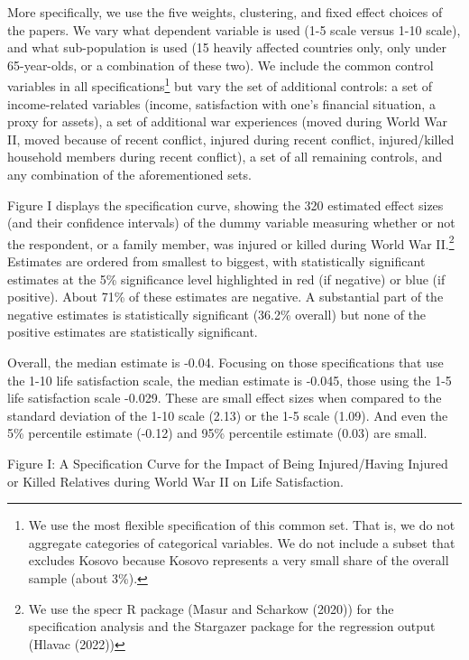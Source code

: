\documentclass[
  letterpaper,
  DIV=11,
  numbers=noendperiod]{scrartcl}
\begin{document}
More specifically, we use the five weights, clustering, and fixed effect
choices of the papers. We vary what dependent variable is used (1-5
scale versus 1-10 scale), and what sub-population is used (15 heavily
affected countries only, only under 65-year-olds, or a combination of
these two). We include the common control variables in all
specifications\footnote{We use the most flexible specification of this
  common set. That is, we do not aggregate categories of categorical
  variables. We do not include a subset that excludes Kosovo because
  Kosovo represents a very small share of the overall sample (about
  3\%).} but vary the set of additional controls: a set of
income-related variables (income, satisfaction with one's financial
situation, a proxy for assets), a set of additional war experiences
(moved during World War II, moved because of recent conflict, injured
during recent conflict, injured/killed household members during recent
conflict), a set of all remaining controls, and any combination of the
aforementioned sets.

Figure I displays the specification curve, showing the 320 estimated
effect sizes (and their confidence intervals) of the dummy variable
measuring whether or not the respondent, or a family member, was injured
or killed during World War II.\footnote{We use the specr R package
  (Masur and Scharkow (2020)) for the specification analysis and the
  Stargazer package for the regression output (Hlavac (2022))} Estimates
are ordered from smallest to biggest, with statistically significant
estimates at the 5\% significance level highlighted in red (if negative)
or blue (if positive). About 71\% of these estimates are negative. A
substantial part of the negative estimates is statistically significant
(36.2\% overall) but none of the positive estimates are statistically
significant.

Overall, the median estimate is -0.04. Focusing on those specifications
that use the 1-10 life satisfaction scale, the median estimate is
-0.045, those using the 1-5 life satisfaction scale -0.029. These are
small effect sizes when compared to the standard deviation of the 1-10
scale (2.13) or the 1-5 scale (1.09). And even the 5\% percentile
estimate (-0.12) and 95\% percentile estimate (0.03) are small.

Figure I: A Specification Curve for the Impact of Being Injured/Having
Injured or Killed Relatives during World War II on Life Satisfaction.
\end{document}

